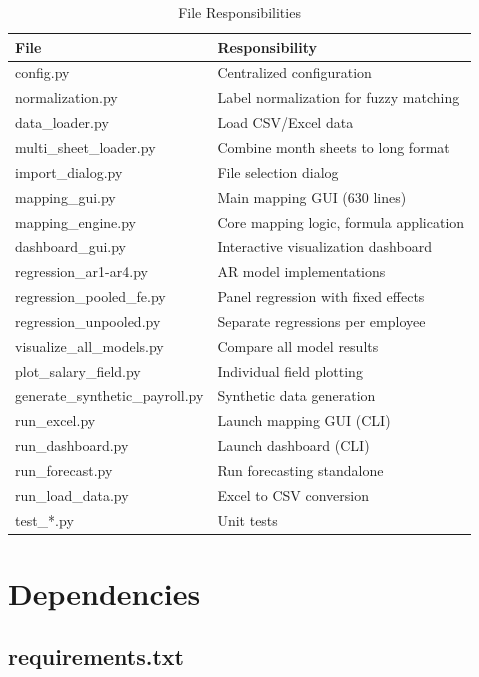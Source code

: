 \begin{table}[H]
\centering
\footnotesize
\begin{tabularx}{\textwidth}{lX}
\toprule
\textbf{File} & \textbf{Responsibility} \\
\midrule
config.py & Centralized configuration \\
normalization.py & Label normalization for fuzzy matching \\
data\_loader.py & Load CSV/Excel data \\
multi\_sheet\_loader.py & Combine month sheets to long format \\
import\_dialog.py & File selection dialog \\
mapping\_gui.py & Main mapping GUI (630 lines) \\
mapping\_engine.py & Core mapping logic, formula application \\
dashboard\_gui.py & Interactive visualization dashboard \\
regression\_ar1-ar4.py & AR model implementations \\
regression\_pooled\_fe.py & Panel regression with fixed effects \\
regression\_unpooled.py & Separate regressions per employee \\
visualize\_all\_models.py & Compare all model results \\
plot\_salary\_field.py & Individual field plotting \\
generate\_synthetic\_payroll.py & Synthetic data generation \\
run\_excel.py & Launch mapping GUI (CLI) \\
run\_dashboard.py & Launch dashboard (CLI) \\
run\_forecast.py & Run forecasting standalone \\
run\_load\_data.py & Excel to CSV conversion \\
test\_*.py & Unit tests \\
\bottomrule
\end{tabularx}
\caption{File Responsibilities}
\end{table}

\section{Dependencies}

\subsection{requirements.txt}

